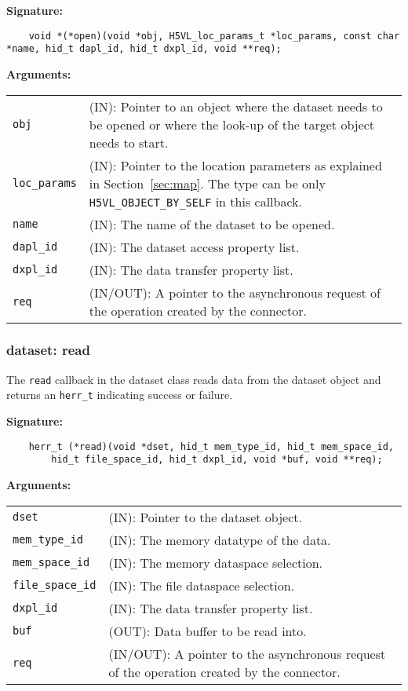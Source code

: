 \begin{mdframed}[style=bgbox]
\textbf{Signature:}
\begin{lstlisting}
    void *(*open)(void *obj, H5VL_loc_params_t *loc_params, const char *name, hid_t dapl_id, hid_t dxpl_id, void **req);
\end{lstlisting}

\textbf{Arguments:}\\
\begin{tabular}{l p{13.5cm}}
  \texttt{obj} & (IN): Pointer to an object where the dataset needs to be
  opened or where the look-up of the target object needs to start.\\
  \texttt{loc\_params} & (IN): Pointer to the location parameters as explained in
  Section~\ref{sec:map}. The type can be only \texttt{H5VL\_OBJECT\_BY\_SELF} in this callback. \\
  \texttt{name} & (IN): The name of the dataset to be opened.\\
  \texttt{dapl\_id} & (IN): The dataset access property list.\\
  \texttt{dxpl\_id} & (IN): The data transfer property list.\\
  \texttt{req} & (IN/OUT): A pointer to the asynchronous request of the
  operation created by the connector.\\
\end{tabular}
\end{mdframed}

\subsubsection{dataset: read}
The \texttt{read} callback in the dataset class  reads data from
the dataset object and returns an \texttt{herr\_t} indicating success or
failure.\bigskip

\begin{mdframed}[style=bgbox]
\textbf{Signature:}
\begin{lstlisting}
    herr_t (*read)(void *dset, hid_t mem_type_id, hid_t mem_space_id, 
        hid_t file_space_id, hid_t dxpl_id, void *buf, void **req);
\end{lstlisting}

\textbf{Arguments:}\\
\begin{tabular}{l p{13.5cm}}
  \texttt{dset} & (IN): Pointer to the dataset object.\\
  \texttt{mem\_type\_id} & (IN): The memory datatype of the data.\\
  \texttt{mem\_space\_id} & (IN): The memory dataspace selection.\\
  \texttt{file\_space\_id} & (IN): The file dataspace selection.\\
  \texttt{dxpl\_id} & (IN): The data transfer property list.\\
  \texttt{buf} & (OUT): Data buffer to be read into.\\
  \texttt{req} & (IN/OUT): A pointer to the asynchronous request of the
  operation created by the connector.\\
\end{tabular}
\end{mdframed}

